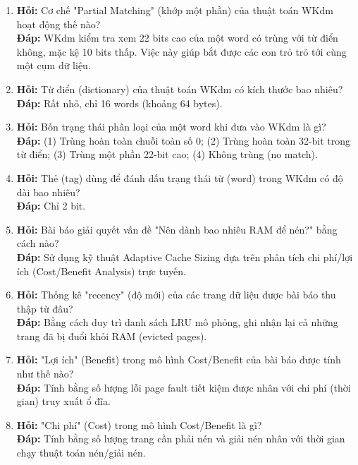 \documentclass[12pt,a4paper]{article}
\begin{document}
\begin{enumerate}
    \item \textbf{Hỏi:} Cơ chế "Partial Matching" (khớp một phần) của thuật toán WKdm hoạt động thế nào? \\
    \textbf{Đáp:} WKdm kiểm tra xem 22 bits cao của một word có trùng với từ điển không, mặc kệ 10 bits thấp. Việc này giúp bắt được các con trỏ trỏ tới cùng một cụm dữ liệu.
    
    \item \textbf{Hỏi:} Từ điển (dictionary) của thuật toán WKdm có kích thước bao nhiêu? \\
    \textbf{Đáp:} Rất nhỏ, chỉ 16 words (khoảng 64 bytes).
    
    \item \textbf{Hỏi:} Bốn trạng thái phân loại của một word khi đưa vào WKdm là gì? \\
    \textbf{Đáp:} (1) Trùng hoàn toàn chuỗi toàn số 0; (2) Trùng hoàn toàn 32-bit trong từ điển; (3) Trùng một phần 22-bit cao; (4) Không trùng (no match).
    
    \item \textbf{Hỏi:} Thẻ (tag) dùng để đánh dấu trạng thái từ (word) trong WKdm có độ dài bao nhiêu? \\
    \textbf{Đáp:} Chỉ 2 bit.
    
    \item \textbf{Hỏi:} Bài báo giải quyết vấn đề "Nên dành bao nhiêu RAM để nén?" bằng cách nào? \\
    \textbf{Đáp:} Sử dụng kỹ thuật Adaptive Cache Sizing dựa trên phân tích chi phí/lợi ích (Cost/Benefit Analysis) trực tuyến.
    
    \item \textbf{Hỏi:} Thống kê "recency" (độ mới) của các trang dữ liệu được bài báo thu thập từ đâu? \\
    \textbf{Đáp:} Bằng cách duy trì danh sách LRU mô phỏng, ghi nhận lại cả những trang đã bị đuổi khỏi RAM (evicted pages).
    
    \item \textbf{Hỏi:} "Lợi ích" (Benefit) trong mô hình Cost/Benefit của bài báo được tính như thế nào? \\
    \textbf{Đáp:} Tính bằng số lượng lỗi page fault tiết kiệm được nhân với chi phí (thời gian) truy xuất ổ đĩa.
    
    \item \textbf{Hỏi:} "Chi phí" (Cost) trong mô hình Cost/Benefit là gì? \\
    \textbf{Đáp:} Tính bằng số lượng trang cần phải nén và giải nén nhân với thời gian chạy thuật toán nén/giải nén.
    

\end{enumerate}
\end{document}
